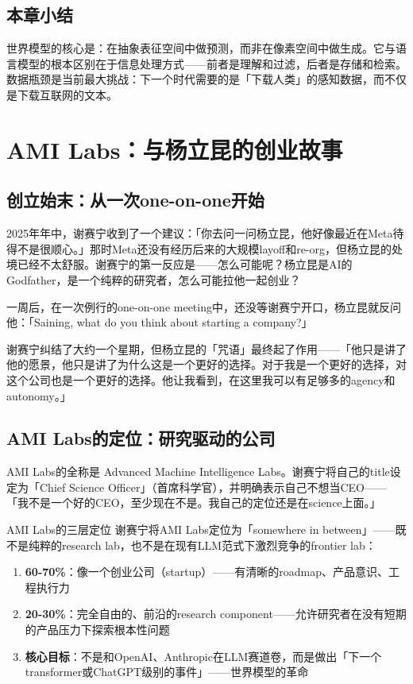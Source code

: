 \documentclass[a4paper]{article}
\begin{document}
\subsection{本章小结}
世界模型的核心是：在抽象表征空间中做预测，而非在像素空间中做生成。它与语言模型的根本区别在于信息处理方式——前者是理解和过滤，后者是存储和检索。数据瓶颈是当前最大挑战：下一个时代需要的是「下载人类」的感知数据，而不仅是下载互联网的文本。

\section{AMI Labs：与杨立昆的创业故事}

\subsection{创立始末：从一次one-on-one开始}

2025年年中，谢赛宁收到了一个建议：「你去问一问杨立昆，他好像最近在Meta待得不是很顺心。」那时Meta还没有经历后来的大规模layoff和re-org，但杨立昆的处境已经不太舒服。谢赛宁的第一反应是——怎么可能呢？杨立昆是AI的Godfather，是一个纯粹的研究者，怎么可能拉他一起创业？

一周后，在一次例行的one-on-one meeting中，还没等谢赛宁开口，杨立昆就反问他：「Saining, what do you think about starting a company?」

谢赛宁纠结了大约一个星期，但杨立昆的「咒语」最终起了作用——「他只是讲了他的愿景，他只是讲了为什么这是一个更好的选择。对于我是一个更好的选择，对这个公司也是一个更好的选择。他让我看到，在这里我可以有足够多的agency和autonomy。」

\subsection{AMI Labs的定位：研究驱动的公司}

AMI Labs的全称是 Advanced Machine Intelligence Labs。谢赛宁将自己的title设定为「Chief Science Officer」（首席科学官），并明确表示自己不想当CEO——「我不是一个好的CEO，至少现在不是。我自己的定位还是在science上面。」

\begin{importantbox}{AMI Labs的三层定位}
谢赛宁将AMI Labs定位为「somewhere in between」——既不是纯粹的research lab，也不是在现有LLM范式下激烈竞争的frontier lab：

\begin{enumerate}
  \item \textbf{60-70\%}：像一个创业公司（startup）——有清晰的roadmap、产品意识、工程执行力
  \item \textbf{20-30\%}：完全自由的、前沿的research component——允许研究者在没有短期的产品压力下探索根本性问题
  \item \textbf{核心目标}：不是和OpenAI、Anthropic在LLM赛道卷，而是做出「下一个transformer或ChatGPT级别的事件」——世界模型的革命
\end{enumerate}
\end{importantbox}
\end{document}
